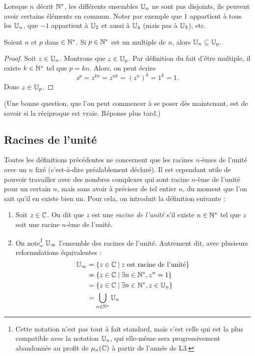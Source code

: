 \begin{remarque}
Lorsque $n$ décrit $\mathbb{N}^*$, les différents ensembles $\mathbb{U}_n$ ne sont pas disjoints, ils peuvent avoir certains éléments en commun. Noter par exemple que $1$ appartient à tous les $\mathbb{U}_n$, que $-1$ appartient à $\mathbb{U}_2$ et aussi à $\mathbb{U}_4$ (mais pas à $\mathbb{U}_3$), etc.%
\end{remarque}

\begin{proposition}
Soient $n$ et $p$ dans $\in\mathbb{N}^*$. Si $p\in\mathbb{N}^*$ est un multiple de $n$, alors $\mathbb{U}_n\subseteq \mathbb{U}_p$.
\end{proposition}
\begin{proof}
Soit $z\in \mathbb{U}_n$. Montrons que $z\in \mathbb{U}_p$.
Par définition du fait d'être multiple, il existe $k\in \mathbb{N}^*$ tel que $p=kn$. Alors, on peut écrire
\[ z^p=z^{kn}=z^{nk}=(z^n)^k=1^k=1.\]
Donc $z\in \mathbb{U}_p$.
\end{proof}

(Une bonne question, que l'on peut commencer à se poser dès maintenant, est de savoir si la réciproque est vraie. Réponse plus tard.)



\subsection{Racines de l'unité}

Toutes les définitions précédentes ne concernent que les racines $n$-èmes de l'unité avec un $n$ fixé (c'est-à-dire préalablement déclaré). Il est cependant utile de  pouvoir travailler avec des nombres complexes qui sont \og racine $n$-ème de l'unité  pour un certain $n$\fg{}, mais sans avoir à préciser de tel entier $n$, du moment que l'on sait qu'il en existe bien un. Pour cela, on introduit la définition suivante :

\begin{definition}
\begin{enumerate}
\item Soit $z\in \mathbb{C}$. On dit que $z$ est une \emph{racine de l'unité} s'il existe $n\in \mathbb{N}^*$ tel que $z$ soit une racine $n$-ème de l'unité. 
\item On note\footnote{Cette notation n'est pas tout à fait standard, mais c'est celle qui est la plus compatible avec la notation $\mathbb{U}_n$, qui elle-même sera progressivement abandonnée au profit de $\mu_n(\mathbb{C})$ à partir de l'année de L3.} $\mathbb{U}_\infty$ l'ensemble des racines de l'unité. Autrement dit, avec plusieurs reformulations équivalentes :
\begin{align*}
\mathbb{U}_\infty &= \left\{z\in \mathbb{C} \:\middle\vert\: \text{$z$ est racine de l'unité}\right\}\\
&= \left\{z\in \mathbb{C}\:\middle\vert\:\exists n\in \mathbb{N}^*, z^n=1\right\}\\
&= \left\{z\in \mathbb{C}\:\middle\vert\:\exists n\in \mathbb{N}^*, z\in \mathbb{U}_n\right\}\\
&= \bigcup_{n\in \mathbb{N}^*} \mathbb{U}_n
\end{align*}
\end{enumerate}
\end{definition}

